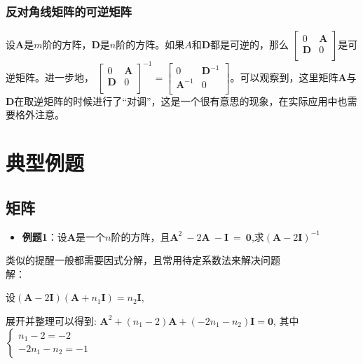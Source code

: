 \documentclass{ctexart}
\begin{document}
            \subsubsection{反对角线矩阵的可逆矩阵}
            设$\mathbf{A}$是$m$阶的方阵，$\mathbf{D}$是$n$阶的方阵。如果$A$和$\mathbf{D}$都是可逆的，那么
            $\begin{bmatrix}
                0 & \mathbf{A} \\
                \mathbf{D} & 0 \\
            \end{bmatrix}$是可逆矩阵。进一步地，
            $
            \begin{bmatrix}
                0 & \mathbf{A} \\
                \mathbf{D} & 0 \\
            \end{bmatrix}^{-1} = \begin{bmatrix}
                0 & \mathbf{D}^{-1} \\
                \mathbf{A}^{-1} & 0 \\
            \end{bmatrix}
            $。可以观察到，这里矩阵$\mathbf{A}$与$\mathbf{D}$在取逆矩阵的时候进行了“对调”，这是一个很有意思的现象，在实际应用中也需要格外注意。
    \section{典型例题}
            \subsection{矩阵}
            \begin{itemize}
                \item \textbf{例题1}：设$\mathbf{A}$是一个$n$阶的方阵，且$\mathbf{A}^2~-2\mathbf{A}~-\mathbf{I}~=~\mathbf{0}$,求$(\mathbf{A}-2\mathbf{I})^{-1}$
            \end{itemize}
            
            {\fangsong 类似的提醒一般都需要因式分解，且常用待定系数法来解决问题}\\
            
            解：

            设$(\mathbf{A}-2\mathbf{I})(\mathbf{A}+n_1\mathbf{I})=n_2\mathbf{I}$,
            
            展开并整理可以得到:
            $\mathbf{A}^2+(n_1-2)\mathbf{A}+(-2n_1-n_2)\mathbf{I}=\mathbf{0}$,
            其中$\begin{cases}
                n_1-2=-2\\
                -2n_1-n_2=-1
            \end{cases}$
            
\end{document}

